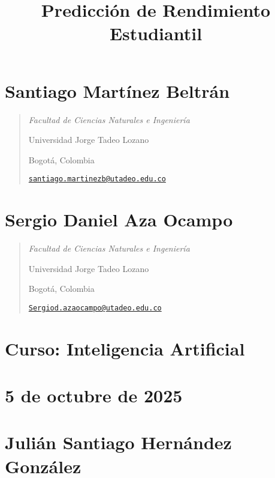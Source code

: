 \documentclass[
]{article}
\title{Predicción de Rendimiento Estudiantil}
\author{}
\date{}
\begin{document}
\maketitle

\hypertarget{santiago-martuxednez-beltruxe1n}{%
\section{Santiago Martínez
Beltrán}\label{santiago-martuxednez-beltruxe1n}}

\begin{quote}
\emph{Facultad de Ciencias Naturales e Ingeniería}

Universidad Jorge Tadeo Lozano

Bogotá, Colombia

\href{mailto:santiago.martinezb@utadeo.edu.co}{\nolinkurl{santiago.martinezb@utadeo.edu.co}}
\end{quote}

\hypertarget{sergio-daniel-aza-ocampo}{%
\section{\texorpdfstring{\hfill\break
Sergio Daniel Aza
Ocampo}{ Sergio Daniel Aza Ocampo}}\label{sergio-daniel-aza-ocampo}}

\begin{quote}
\emph{Facultad de Ciencias Naturales e Ingeniería}

Universidad Jorge Tadeo Lozano

Bogotá, Colombia

\href{mailto:Sergiod.azaocampo@utadeo.edu.co}{\nolinkurl{Sergiod.azaocampo@utadeo.edu.co}}
\end{quote}

\hypertarget{curso-inteligencia-artificial}{%
\section{Curso: Inteligencia
Artificial}\label{curso-inteligencia-artificial}}

\hypertarget{de-octubre-de-2025}{%
\section{5 de octubre de 2025}\label{de-octubre-de-2025}}

\hypertarget{juliuxe1n-santiago-hernuxe1ndez-gonzuxe1lez}{%
\section{\texorpdfstring{\hfill\break
Julián Santiago Hernández
González}{ Julián Santiago Hernández González}}\label{juliuxe1n-santiago-hernuxe1ndez-gonzuxe1lez}}
\end{document}
